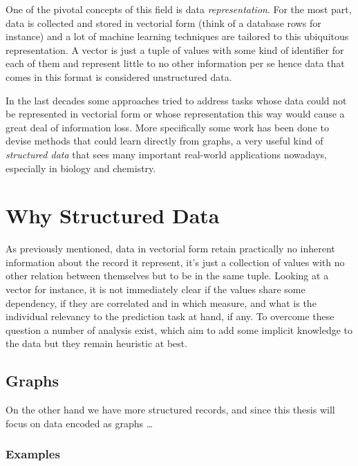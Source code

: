 One of the pivotal concepts of this field is data \emph{representation}.
For the most part, data is collected and stored in vectorial form (think of
a database rows for instance) and a lot of machine learning techniques are
tailored to this ubiquitous representation.
A vector is just a tuple of values with some kind of identifier for each of them
and represent little to no other information per se hence data that comes in
this format is considered unstructured data.

In the last decades some approaches tried to address tasks whose data could
not be represented in vectorial form or whose representation this way would cause
a great deal of information loss.
More specifically some work has been done to devise methods that could learn
directly from graphs, a very useful kind of \emph{structured data} that sees many
important real-world applications nowadays, especially in biology and chemistry.


\section{Why Structured Data}
As previously mentioned, data in vectorial form retain practically no inherent
information about the record it represent, it's just a collection of values with
no other relation between themselves but to be in the same tuple.
Looking at a vector for instance, it is not immediately clear if the values share
some dependency, if they are correlated and in which measure, and what is the
individual relevancy to the prediction task at hand, if any.
To overcome these question a number of analysis exist, which aim to add some
implicit knowledge to the data but they remain heuristic at best.

\subsection{Graphs}
On the other hand we have more structured records, and since this thesis will
focus on data encoded as graphs
\dots

\subsubsection{Examples}
\label{subsubsec:examples}


